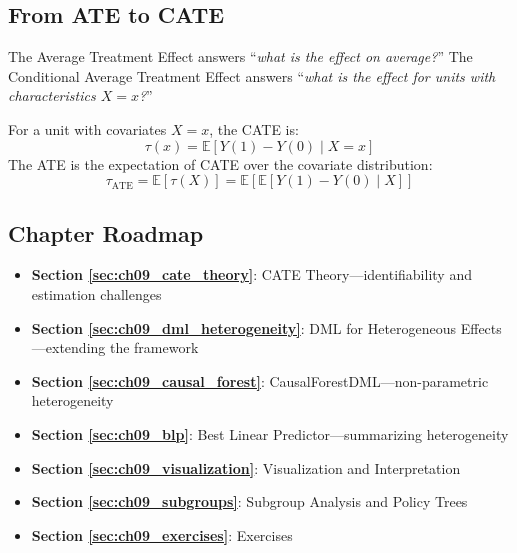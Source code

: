 \subsection{From ATE to CATE}

The Average Treatment Effect answers ``\textit{what is the effect on average?}'' The Conditional Average Treatment Effect answers ``\textit{what is the effect for units with characteristics $X = x$?}''

\begin{definition}
\label{def:cate}
For a unit with covariates $X = x$, the CATE is:
\begin{equation}
\tau(x) = \mathbb{E}[Y(1) - Y(0) \mid X = x]
\label{eq:cate_definition}
\end{equation}
The ATE is the expectation of CATE over the covariate distribution:
\begin{equation}
\tau_{\text{ATE}} = \mathbb{E}[\tau(X)] = \mathbb{E}[\mathbb{E}[Y(1) - Y(0) \mid X]]
\end{equation}
\end{definition}


\subsection{Chapter Roadmap}

\begin{itemize}
    \item \textbf{Section \ref{sec:ch09_cate_theory}}: CATE Theory---identifiability and estimation challenges
    \item \textbf{Section \ref{sec:ch09_dml_heterogeneity}}: DML for Heterogeneous Effects---extending the framework
    \item \textbf{Section \ref{sec:ch09_causal_forest}}: CausalForestDML---non-parametric heterogeneity
    \item \textbf{Section \ref{sec:ch09_blp}}: Best Linear Predictor---summarizing heterogeneity
    \item \textbf{Section \ref{sec:ch09_visualization}}: Visualization and Interpretation
    \item \textbf{Section \ref{sec:ch09_subgroups}}: Subgroup Analysis and Policy Trees
    \item \textbf{Section \ref{sec:ch09_exercises}}: Exercises
\end{itemize}


